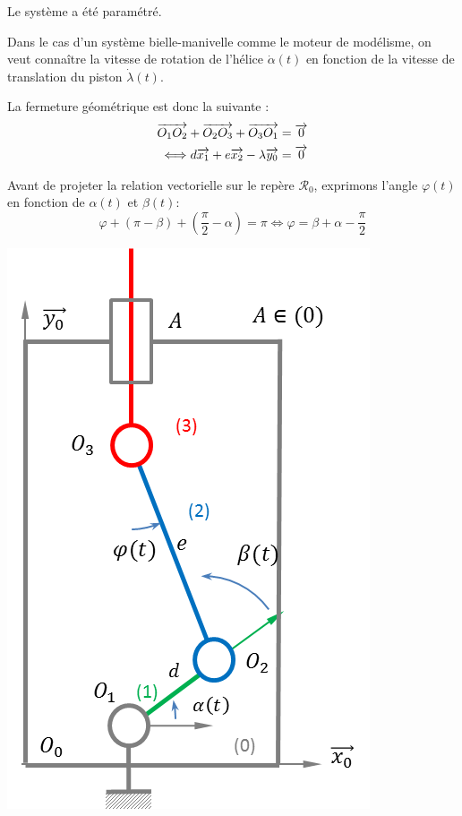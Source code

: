 \documentclass[11pt,oneside]{article}
\begin{document}
\begin{exemple}

\begin{minipage}[c]{.6\linewidth}
Le système a été paramétré. 

Dans le cas d'un système bielle-manivelle comme le moteur de modélisme, on veut connaître la vitesse de rotation de l'hélice $\dot{\alpha}(t)$ en fonction de la vitesse de translation du piston $\dot{\lambda}(t)$. 

La fermeture géométrique est donc la suivante : 
\begin{eqnarray*}
\overrightarrow{O_1 O_2} + \overrightarrow{O_2 O_3} +\overrightarrow{O_3 O_1} = \overrightarrow{0} \\
\Longleftrightarrow d\overrightarrow{x_1} + e \overrightarrow{x_2} - \lambda \overrightarrow{y_0}  = \overrightarrow{0}
\end{eqnarray*}

Avant de projeter la relation vectorielle sur le repère $\mathcal{R}_0$, exprimons l'angle $\varphi(t)$ en fonction de $\alpha(t)$ et $\beta(t)$:
$$
\varphi + \left(\pi-\beta\right)+\left(\dfrac{\pi}{2}-\alpha\right) = \pi 
\Longleftrightarrow
\varphi = \beta+\alpha-\dfrac{\pi}{2}
$$
\end{minipage}\hfill
\begin{minipage}[c]{.35\linewidth}
\begin{center}
\includegraphics[width=.9\textwidth]{png/chaine}
\end{center}
\end{minipage}


\end{exemple}
\end{document}
